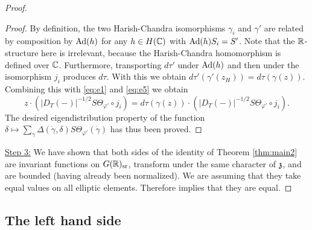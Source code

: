 \documentclass{article}
\theoremstyle{definition}
\numberwithin{equation}{section}
\renewcommand{\-}{\hyp{}}
\newcommand{\warn}[1]{{\leavevmode\color{red}[#1]}}
\begin{document}
\begin{proof}
\begin{proof}
		By definition, the two Harish-Chandra isomorphisms $\gamma_i$ and $\gamma'$ are related by composition by $\textrm{Ad}(h)$ for any $h \in H(\mathbb{C})$ with $\textrm{Ad}(h)S_i=S'$. Note that the $\mathbb{R}$-structure here is irrelevant, because the Harish-Chandra homomorphism is defined over $\mathbb{C}$. Furthermore, transporting $d\tau'$ under $\textrm{Ad}(h)$ and then under the isomorphism $j_i$ produces $d\tau$. 
		With this we obtain $d\tau'(\gamma'(z_H))=d\tau(\gamma(z))$. Combining this with \eqref{eq:e1} and \eqref{eq:e5} we obtain
		\[  z \cdot (|D_T(-)|^{-1/2}S\Theta_{\varphi'}\circ j_i) = d\tau(\gamma(z)) \cdot (|D_T(-)|^{-1/2}S\Theta_{\varphi'}\circ j_i). \] 
		The desired eigendistribution property of the function $\delta \mapsto \sum_\gamma \Delta(\dot\gamma,\delta)S\Theta_{\varphi'}(\dot\gamma)$ has thus been proved.
	\end{proof}




	\underline{Step 3:} We have shown that both sides of the identity of Theorem \ref{thm:main2} are invariant functions on $G(\mathbb{R})_{\textrm{sr}}$, transform under the same character of $\mathfrak{z}$, and are bounded (having already been normalized). We are assuming that they take equal values on all elliptic elements. Therefore \cite[Lemma 44]{HCDSI} implies that they are equal.
\end{proof}

\subsection{The left hand side}


\end{document}
